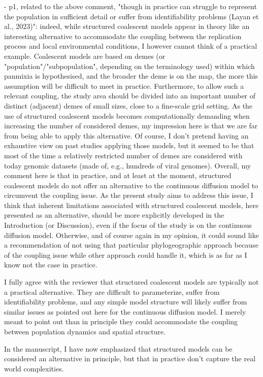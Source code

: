 \documentclass[11pt, oneside]{article}   	%
\newcommand{\response}[1]{{\color{black}{\bf Response:} #1}}
\begin{document}
- p1, related to the above comment, "though in practice can struggle to represent the population in sufficient detail or suffer from identifiability problems (Layan et al., 2023)": indeed, while structured coalescent models appear in theory like an interesting alternative to accommodate the coupling between the replication process and local environmental conditions, I however cannot think of a practical example. Coalescent models are based on demes (or "population"/"subpopulation", depending on the terminology used) within which panmixia is hypothesised, and the broader the deme is on the map, the more this assumption will be difficult to meet in practice. Furthermore, to allow such a relevant coupling, the study area should be divided into an important number of distinct (adjacent) demes of small sizes, close to a fine-scale grid setting. As the use of structured coalescent models becomes computationally demanding when increasing the number of considered demes, my impression here is that we are far from being able to apply this alternative. Of course, I don't pretend having an exhaustive view on past studies applying those models, but it seemed to be that most of the time a relatively restricted number of demes are considered with today genomic datasets (made of, e.g., hundreds of viral genomes). Overall, my comment here is that in practice, and at least at the moment, structured coalescent models do not offer an alternative to the continuous diffusion model to circumvent the coupling issue. As the present study aims to address this issue, I think that inherent limitations associated with structured coalescent models, here presented as an alternative, should be more explicitly developed in the Introduction (or Discussion), even if the focus of the study is on the continuous diffusion model. Otherwise, and of course again in my opinion, it could sound like a recommendation of not using that particular phylogeographic approach because of the coupling issue while other approach could handle it, which is as far as I know not the case in practice.

\response{I fully agree with the reviewer that structured coalescent models are typically not a practical alternative. They are difficult to parameterize, suffer from identifiability problems, and any simple model structure will likely suffer from similar issues as pointed out here for the continuous diffusion model.
I merely meant to point out than in principle they could accommodate the coupling between population dynamics and spatial structure.

In the manuscript, I have now emphasized that structured models can be considered an alternative in principle, but that in practice don't capture the real world complexities.
}
\end{document}
